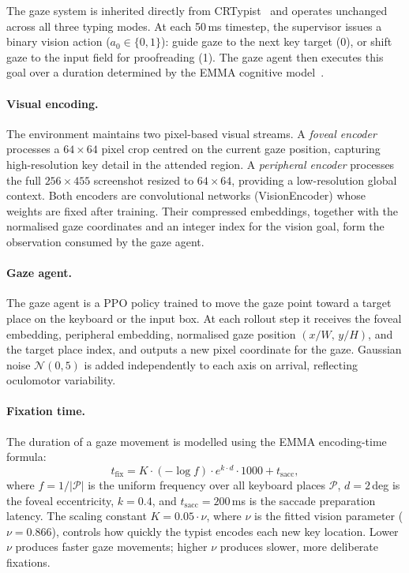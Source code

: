 \documentclass[sigconf,review,anonymous]{acmart}
\begin{document}
The gaze system is inherited directly from CRTypist~\cite{crtypist} and operates unchanged across all three typing modes. At each 50\,ms timestep, the supervisor issues a binary vision action ($a_0 \in \{0, 1\}$): guide gaze to the next key target (0), or shift gaze to the input field for proofreading (1). The gaze agent then executes this goal over a duration determined by the EMMA cognitive model~\cite{kieras1997epic}.

\paragraph{Visual encoding.}
The environment maintains two pixel-based visual streams. A \emph{foveal encoder} processes a $64 \times 64$ pixel crop centred on the current gaze position, capturing high-resolution key detail in the attended region. A \emph{peripheral encoder} processes the full $256 \times 455$ screenshot resized to $64 \times 64$, providing a low-resolution global context. Both encoders are convolutional networks (VisionEncoder) whose weights are fixed after training. Their compressed embeddings, together with the normalised gaze coordinates and an integer index for the vision goal, form the observation consumed by the gaze agent.

\paragraph{Gaze agent.}
The gaze agent is a PPO policy trained to move the gaze point toward a target place on the keyboard or the input box. At each rollout step it receives the foveal embedding, peripheral embedding, normalised gaze position $(x/W,\, y/H)$, and the target place index, and outputs a new pixel coordinate for the gaze. Gaussian noise $\mathcal{N}(0, 5)$ is added independently to each axis on arrival, reflecting oculomotor variability.

\paragraph{Fixation time.}
The duration of a gaze movement is modelled using the EMMA encoding-time formula:
\begin{equation}
  t_{\mathrm{fix}} = K \cdot (-\log f) \cdot e^{k \cdot d} \cdot 1000 + t_{\mathrm{sacc}},
  \label{eq:fixation}
\end{equation}
where $f = 1/|\mathcal{P}|$ is the uniform frequency over all keyboard places $\mathcal{P}$, $d = 2$\,deg is the foveal eccentricity, $k = 0.4$, and $t_{\mathrm{sacc}} = 200$\,ms is the saccade preparation latency. The scaling constant $K = 0.05 \cdot \nu$, where $\nu$ is the fitted vision parameter ($\nu = 0.866$), controls how quickly the typist encodes each new key location. Lower $\nu$ produces faster gaze movements; higher $\nu$ produces slower, more deliberate fixations.
\end{document}
